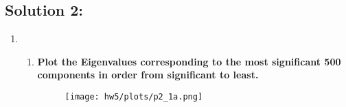 \documentclass[submit]{harvardml}
\begin{document}
\subsection*{Solution 2:}
\begin{enumerate}
    \item
    \begin{enumerate}
        \item \textbf{Plot the Eigenvalues corresponding to the most significant 500 components in order from significant to least.}
        \begin{figure}[H]
            \texttt{[image: hw5/plots/p2\_1a.png]}
        \centering
    \end{figure}
    \end{enumerate}
\end{enumerate}

\newpage
\end{document}
